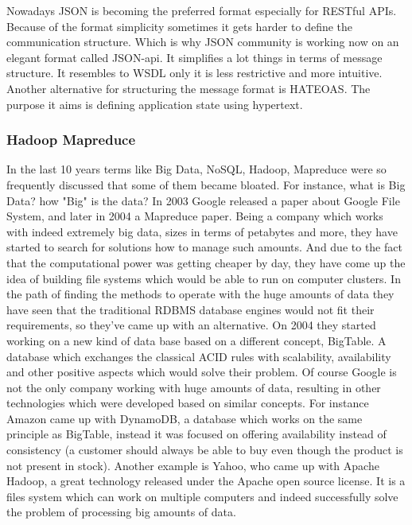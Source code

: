 Nowadays JSON is becoming the preferred format especially for RESTful APIs. Because of the format simplicity sometimes it gets harder to define the communication structure. Which is why JSON community is working now on an elegant format called JSON-api. It simplifies a lot things in terms of message structure. It resembles to WSDL only it is less restrictive and more intuitive. Another alternative for structuring the message format is HATEOAS. The purpose it aims is defining application state using hypertext.

\subsubsection{Hadoop Mapreduce}
In the last 10 years terms like Big Data, NoSQL, Hadoop, Mapreduce were so frequently discussed that some of them became bloated. For instance, what is Big Data? how "Big" is the data? In 2003 Google released a paper about Google File System, and later in 2004 a Mapreduce paper. Being a company which works with indeed extremely big data, sizes in terms of petabytes and more, they have started to search for solutions how to manage such amounts. And due to the fact that the computational power was getting cheaper by day, they have come up the idea of building file systems which would be able to run on computer clusters. In the path of finding the methods to operate with the huge amounts of data they have seen that the traditional RDBMS database engines would not fit their requirements, so they've came up with an alternative. On 2004 they started working on a new kind of data base based on a different concept, BigTable. A database which exchanges the classical ACID rules with scalability, availability and other positive aspects which would solve their problem. Of course Google is not the only company working with huge amounts of data, resulting in other technologies which were developed based on similar concepts. For instance Amazon came up with DynamoDB, a database which works on the same principle as BigTable, instead it was focused on offering availability instead of consistency (a customer should always be able to buy even though the product is not present in stock). Another example is Yahoo, who came up with Apache Hadoop, a great technology released under the Apache open source license. It is a files system which can work on multiple computers and indeed successfully solve the problem of processing big amounts of data.

